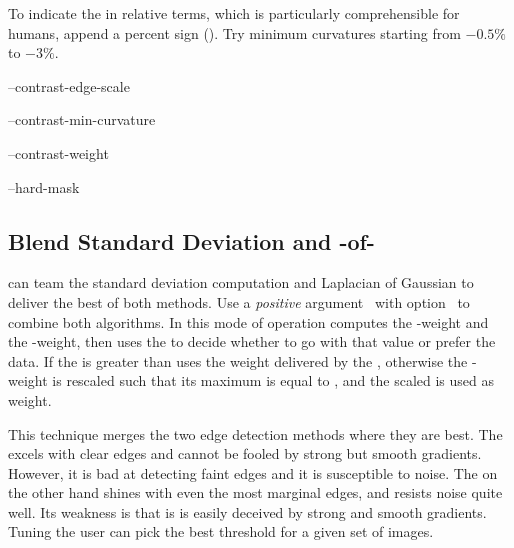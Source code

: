 To indicate the  in relative terms, which is particularly comprehensible for
humans, append a percent sign (\sample{\%}).  Try minimum curvatures starting from $-0.5\%$ to
$-3\%$.

\begin{optionsummary}
\item[--contrast-edge-scale] \sectionName~
\item[--contrast-min-curvature] \sectionName~
\item[--contrast-weight] \sectionName~
\item[--hard-mask] \sectionName~
\end{optionsummary}


\subsection[Blend \acronym{SDev} and \acronym{LoG}]%
{\label{sec:blend-sdev-and-log}%
%
%
Blend Standard Deviation and \hyp{}of\hyp{}}

\App{} can team the standard deviation computation and Laplacian of Gaussian to deliver the best
of both methods.  Use a \emph{positive} argument~ with
option~ to combine both algorithms.  In this mode of operation
\App{} computes the -weight and the -weight, then uses the
 to decide whether to go with that value or prefer the  data.  If the
 is greater than  \App{} uses the weight delivered by the
, otherwise the -weight is rescaled such that its maximum is equal to
, and the scaled  is used as weight.

This technique merges the two edge detection methods where they are best.  The 
excels with clear edges and cannot be fooled by strong but smooth gradients.  However, it is bad
at detecting faint edges and it is susceptible to noise.  The  on the other hand
shines with even the most marginal edges, and resists noise quite well.  Its weakness is that is
is easily deceived by strong and smooth gradients.  Tuning  the user can pick
the best threshold for a given set of images.

